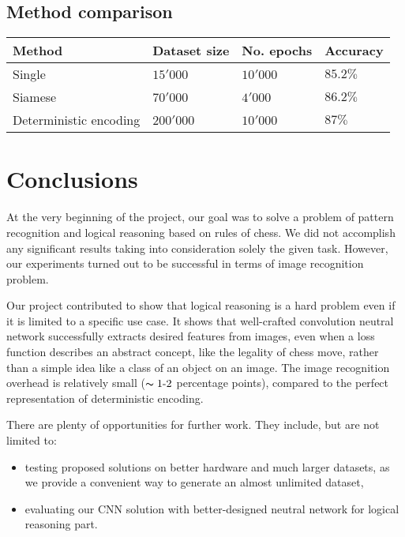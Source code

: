 \documentclass[10pt,twocolumn,letterpaper]{article}
\begin{document}
\subsection{Method comparison}

\begin{center}
    \begin{tabular}{ | p{5em} | p{5em} | p{5em} | p{5em} |}
    \hline
    Method & Dataset size & No. epochs & Accuracy \\ [0.5ex] \hline \hline
    Single & $15'000$ & $10'000$ & $85.2\%$ \\
    \hline
    Siamese & $70'000$ & $4'000$ & $86.2\%$ \\ \hline
    Deterministic encoding & $200'000$ & $10'000$ & $87\%$ \\
    \hline
    \end{tabular}
\end{center}

\section{Conclusions}

At the very beginning of the project, our goal was to solve a problem of pattern
recognition and logical reasoning based on rules of chess. We did not accomplish
any significant results taking into consideration solely the given task.
However, our experiments turned out to be successful in terms of image
recognition problem.

Our project contributed to show that logical reasoning is a hard problem even if
it is limited to a specific use case. It shows that well-crafted convolution
neutral network successfully extracts desired features from images, even when a
loss function describes an abstract concept, like the legality of chess move,
rather than a simple idea like a class of an object on an image. The image
recognition overhead is relatively small ($\thicksim 1 \text{-} 2$ percentage
points), compared to the perfect representation of deterministic encoding.

There are plenty of opportunities for further work. They include, but are not
limited to:
\begin{itemize}
\item testing proposed solutions on better hardware and much larger datasets, as
we provide a convenient way to generate an almost unlimited dataset,
\item evaluating our CNN solution with better-designed neutral network for
logical reasoning part.
\end{itemize}

{\small


}
\end{document}
